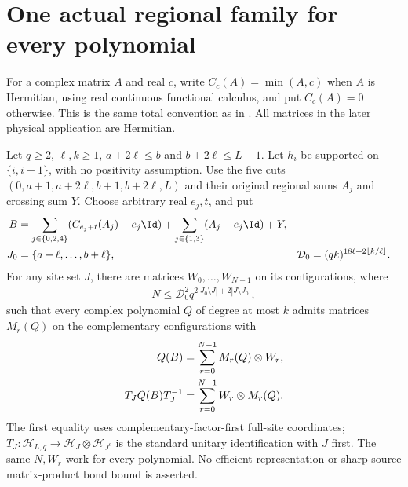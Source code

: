 \section{One actual regional family for every polynomial}

For a complex matrix $A$ and real $c$, write $C_c(A)=\min(A,c)$ when $A$
is Hermitian, using real continuous functional calculus, and put $C_c(A)=0$
otherwise. This is the same total convention as in
\cite[``Centered partial clipping of a finite family'']{QICLean2026Blueprint}.
All matrices in the later physical application are Hermitian.

\begin{lemma}
    \label{thm:actual_clipped_polynomial_family}
    \leanok
    Let $q\ge2$, $\ell,k\ge1$, $a+2\ell\le b$ and $b+2\ell\le L-1$.
    Let $h_i$ be supported on $\{i,i+1\}$, with no positivity assumption.
    Use the five cuts $(0,a+1,a+2\ell,b+1,b+2\ell,L)$ and their original
    regional sums $A_j$ and crossing sum $Y$. Choose arbitrary real $e_j,t$,
    and put
    \begin{align}
        B            & =\sum_{j\in\{0,2,4\}}(C_{e_j+t}(A_j)-e_j\Id)
        +\sum_{j\in\{1,3\}}(A_j-e_j\Id)+Y,\notag                      \\
        J_0          & =\{a+\ell,\ldots,b+\ell\},                   &
        \mathcal D_0 & =(qk)^{18\ell+2\lfloor k/\ell\rfloor}.
    \end{align}
    For any site set $J$, there are matrices $W_0,\ldots,W_{N-1}$ on its
    configurations, where
    \begin{align}
        N\le\mathcal D_0^2q^{2|J_0\setminus J|+2|J\setminus J_0|},
    \end{align}
    such that every complex polynomial $Q$ of degree at most $k$ admits
    matrices $M_r(Q)$ on the complementary configurations with
    \begin{align}
        Q(B)=\sum_{r=0}^{N-1}M_r(Q)\otimes W_r,\notag \\
        T_JQ(B)T_J^{-1}=\sum_{r=0}^{N-1}W_r\otimes M_r(Q).
    \end{align}
    The first equality uses complementary-factor-first full-site coordinates;
    $T_J:\mathcal H_{L,q}\to\mathcal H_J\otimes\mathcal H_{J^c}$ is the
    standard unitary identification with $J$ first. The same $N,W_r$ work
    for every polynomial. No efficient representation or sharp source
    matrix-product bond bound is asserted.
\end{lemma}
